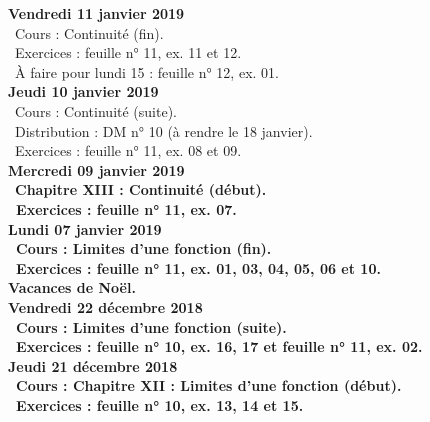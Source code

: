 \documentclass[12pt,a4paper]{article}
\begin{document}
\noindent\textbf{Vendredi 11 janvier 2019}\\
\bu\ Cours : Continuité (fin).\\
\bu\ Exercices : feuille n° 11, ex. 11 et 12.\\
\bu\ À faire pour lundi 15 : feuille n° 12, ex. 01.\vspace{.4cm}\\
 
\noindent\textbf{Jeudi 10 janvier 2019}\\
\bu\ Cours : Continuité (suite).\\
\bu\ Distribution : DM n° 10 (à rendre le 18 janvier).\\
\bu\ Exercices : feuille n° 11, ex. 08 et 09.\vspace{.4cm}\\
 
\noindent\textbf{Mercredi 09 janvier 2019} \\
\bu\ \bf Chapitre XIII \rm : Continuité (début).\\
\bu\ Exercices : feuille n° 11, ex. 07.\vspace{.4cm}\\
 
\noindent\textbf{Lundi 07 janvier 2019} \\
\bu\ Cours : Limites d'une fonction (fin).\\
\bu\ Exercices : feuille n° 11, ex. 01, 03, 04, 05, 06 et 10.\vspace{.4cm}\\

\noindent\textbf{\bf Vacances de Noël}.\vspace{.4cm}\\

\noindent\textbf{Vendredi 22 décembre 2018}\\ 
\bu\ Cours : Limites d'une fonction (suite).\\
\bu\ Exercices : feuille n° 10, ex. 16, 17 et feuille n° 11, ex. 02.\vspace{.4cm}\\
 
\noindent\textbf{Jeudi 21 décembre 2018}\\
\bu\ Cours : \bf Chapitre XII \rm : Limites d'une fonction (début).\\
\bu\ Exercices : feuille n° 10, ex. 13, 14 et 15.\vspace{.4cm}\\
 
\end{document}
